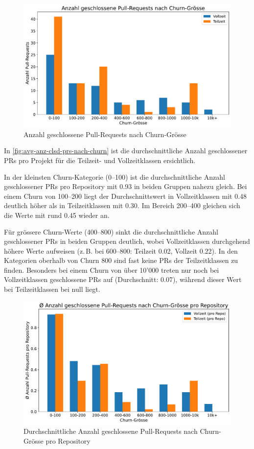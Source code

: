 \begin{figure}[htbp]
    \includegraphics[width=\textwidth]{Figures/anzahl-geschlossene-prs-nach-churn.pdf}
    \caption{Anzahl geschlossene Pull-Requests nach Churn-Grösse}
    \label{fig:anz-clsd-prs-nach-churn}
\end{figure}


In \autoref{fig:avg-anz-clsd-prs-nach-churn} ist die durchschnittliche Anzahl geschlossener PRs pro Projekt für die Teilzeit- und Vollzeitklassen ersichtlich.

In der kleinsten Churn-Kategorie (0--100) ist die durchschnittliche Anzahl geschlossener PRs pro Repository mit 0.93 in beiden Gruppen nahezu gleich. Bei einem Churn von 100--200 liegt der Durchschnittswert in Vollzeitklassen mit 0.48 deutlich höher als in Teilzeitklassen mit 0.30. Im Bereich 200--400 gleichen sich die Werte mit rund 0.45 wieder an.

Für grössere Churn-Werte (400--800) sinkt die durchschnittliche Anzahl geschlossener PRs in beiden Gruppen deutlich, wobei Vollzeitklassen durchgehend höhere Werte aufweisen (z.\,B. bei 600--800: Teilzeit 0.02, Vollzeit 0.22). In den Kategorien oberhalb von Churn 800 sind fast keine PRs der Teilzeitklassen zu finden. Besonders bei einem Churn von über 10'000 treten nur noch bei Vollzeitklassen geschlossene PRs auf (Durchschnitt: 0.07), während dieser Wert bei Teilzeitklassen bei null liegt.

\begin{figure}[htbp]
    \includegraphics[width=\textwidth]{Figures/avg-anz-clsd-prs-nach-churn.pdf}
    \caption{Durchschnittliche Anzahl geschlossene Pull-Requests nach Churn-Grösse pro Repository}
    \label{fig:avg-anz-clsd-prs-nach-churn}
\end{figure}

